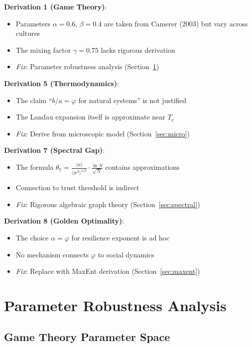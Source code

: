 \documentclass[11pt]{article}
\begin{document}
\textbf{Derivation 1 (Game Theory)}:
\begin{itemize}
\item Parameters $\alpha = 0.6$, $\beta = 0.4$ are taken from Camerer (2003) but vary across cultures
\item The mixing factor $\gamma = 0.75$ lacks rigorous derivation
\item \textit{Fix}: Parameter robustness analysis (Section~\ref{sec:robustness})
\end{itemize}

\textbf{Derivation 5 (Thermodynamics)}:
\begin{itemize}
\item The claim ``$b/a = \varphi$ for natural systems'' is not justified
\item The Landau expansion itself is approximate near $T_c$
\item \textit{Fix}: Derive from microscopic model (Section~\ref{sec:micro})
\end{itemize}

\textbf{Derivation 7 (Spectral Gap)}:
\begin{itemize}
\item The formula $\theta_7 = \frac{\langle w \rangle}{\langle w^2 \rangle^{1/2}} \cdot \frac{\ln N}{\sqrt{N}}$ contains approximations
\item Connection to trust threshold is indirect
\item \textit{Fix}: Rigorous algebraic graph theory (Section~\ref{sec:spectral})
\end{itemize}

\textbf{Derivation 8 (Golden Optimality)}:
\begin{itemize}
\item The choice $\alpha = \varphi$ for resilience exponent is ad hoc
\item No mechanism connects $\varphi$ to social dynamics
\item \textit{Fix}: Replace with MaxEnt derivation (Section~\ref{sec:maxent})
\end{itemize}

\section{Parameter Robustness Analysis}
\label{sec:robustness}

\subsection{Game Theory Parameter Space}
\end{document}
